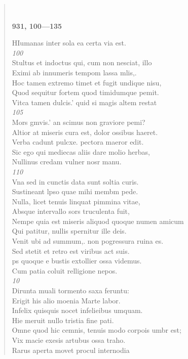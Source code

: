 \documentclass[11pt, a4paper]{report}
\begin{document}
\begin{verse}
        ﻿\pagebreak 
     \marginpar{[356]} \begin{center} \textbf{931, 100—135} \end{center}HIumanas inter sola ea certa via est. \\ \textit{100} \\ Stultus et indoctus qui, cum non nesciat, illo \\ Eximi ab innumeris tempom lassa mlis,. \\ Hoc tamen extremo timet et fugit undique nisu, \\ Quod sequitur fortem quod timidumque pemit. \\ Vitca tamen dulcis.’ quid si magis altem restat \\ \textit{105} \\ Mors gmvis.’ an scimus non graviore pemi? \\ Altior at miseris cura est, dolor ossibus haeret. \\ Verba cadunt pulcxe. pectora maeror edit. \\ Sic ego qui mediecas aliis dare molio herbas, \\ Nullinus credam vulner nosr manu. \\ \textit{110} \\ Vna sed in cunctis data sunt soltia curis. \\ Sustineant lpso quae mihi membm pede. \\ Nulla, licet tenuis linquat pimmina vitae, \\ Absque intervallo sors truculenta fuit, \\ Nempe quia est miseris aliquod quoque numen amicum \\ Qui patitur, nullis spernitur ille deis. \\ Venit ubi ad summum,. non pogressura ruina es. \\ Sed stetit et retro est viribus act suis. \\ ps quoque e bustis extollier ossa videmus. \\ Cum patia coluit relligione nepos. \\ \textit{10} \\ Dirunta muali tormento saxa feruntu: \\ Erigit his alio moenia Marte labor. \\ Infelix quisquis nocet infelieibus umquam. \\ Hie meruit nullo tristia fine pati. \\ Omne quod hic cemnis, tenuis modo corpois umbr est; \\ Vix macie exesis artubus ossa traho. \\ Rarus aperta movet procul internodia 
\end{verse}
\end{document}
